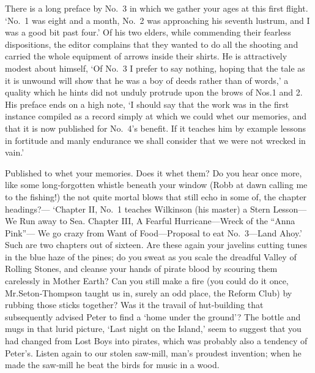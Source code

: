 There is a long preface by No.~3 in which we gather your ages at this first flight.
‘No.~1 was eight and a month,
No.~2 was approaching his seventh lustrum,
and I was a good bit past four.’
Of his two elders, while commending their fearless dispositions,
the editor complains that they wanted to do all the shooting
and carried the whole equipment of arrows inside their shirts.
He is attractively modest about himself,
‘Of No.~3 I prefer to say nothing,
hoping that the tale as it is unwound will show that he was a boy of deeds rather than of words,’
a quality which he hints did not unduly protrude upon the brows of Nos.\@ 1 and 2.
His preface ends on a high note,
‘I should say that the work was in the first instance compiled as a record
simply at which we could whet our memories,
and that it is now published for No.~4’s benefit.
If it teaches him by example lessons in fortitude and manly endurance
we shall consider that we were not wrecked in vain.’

Published to whet your memories.
Does it whet them?
Do you hear once more, like some long‐forgotten whistle beneath your window
(Robb at dawn calling me to the fishing!\@)
the not quite mortal blows that still echo in some of, the chapter headings?—%
‘Chapter II, No.~1 teaches Wilkinson (his master) a Stern Lesson—We Run away to Sea.
Chapter III, A Fearful Hurricane—Wreck of the “Anna Pink”—%
We go crazy from Want of Food—Proposal to eat No.~3—Land Ahoy.’
Such are two chapters out of sixteen.
Are these again your javelins cutting tunes in the blue haze of the pines;
do you sweat as you scale the dreadful Valley of Rolling Stones,
and cleanse your hands of pirate blood by scouring them carelessly in Mother Earth?
Can you still make a fire
(you could do it once,
Mr.\@ Seton‐Thompson taught us in, surely an odd place, the Reform Club)
by rubbing those sticks together?
Was it the travail of hut‐building that subsequently advised Peter to find a ‘home under the ground’?
The bottle and mugs in that lurid picture, ‘Last night on the Island,’
seem to suggest that you had changed from Lost Boys into pirates,
which was probably also a tendency of Peter’s.
Listen again to our stolen saw‐mill, man’s proudest invention;
when he made the saw‐mill he beat the birds for music in a wood.

